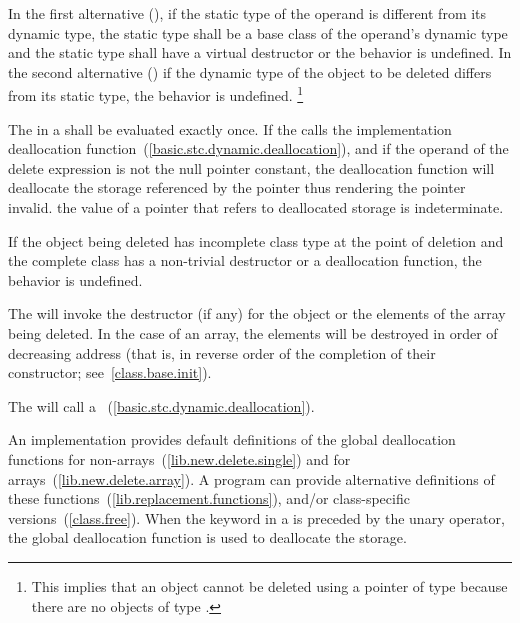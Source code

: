 \pnum
{}%
In the first alternative (), if the static type of
the operand is different from its dynamic type, the static type shall be
a base class of the operand's dynamic type and the static type shall
have a virtual destructor or the behavior is undefined. In the second
alternative () if the dynamic type of the object to
be deleted differs from its static type, the behavior is undefined.%
\footnote{This implies that an object cannot be deleted using a pointer
of type  because there are no objects of type .}

\pnum
The  in a 
shall be evaluated exactly once. If the 
calls the implementation deallocation
function~(\ref{basic.stc.dynamic.deallocation}), and if the operand of
the delete expression is not the null pointer constant, the deallocation
function will deallocate the storage referenced by the pointer thus
rendering the pointer invalid.
\enternote
the value of a pointer that refers to deallocated storage is indeterminate.
\exitnote

\pnum
{}%
If the object being deleted has incomplete class type at the point of
deletion and the complete class has a non-trivial destructor or a
deallocation function, the behavior is undefined.

\pnum
{}%
The  will invoke the
destructor (if any) for the object or the elements of the array being
deleted. In the case of an array, the elements will be destroyed in
order of decreasing address (that is, in reverse order of the completion
of their constructor; see~\ref{class.base.init}).

\pnum
The  will call a
%
%
%
~(\ref{basic.stc.dynamic.deallocation}).

\pnum
\enternote 
An implementation provides default definitions of the global
deallocation functions  for
non-arrays~(\ref{lib.new.delete.single}) and
%
%
 for arrays~(\ref{lib.new.delete.array}). A \Cpp
program can provide alternative definitions of these
functions~(\ref{lib.replacement.functions}), and/or class-specific
versions~(\ref{class.free}).
\exitnote 
When the keyword  in a  is
preceded by the unary \tcode{::} operator, the global deallocation
function is used to deallocate the storage.

